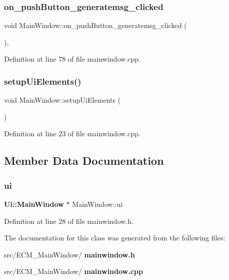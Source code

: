 \subsubsection{on\+\_\+push\+Button\+\_\+generatemsg\+\_\+clicked}
{\footnotesize\ttfamily void Main\+Window\+::on\+\_\+push\+Button\+\_\+generatemsg\+\_\+clicked (\begin{DoxyParamCaption}{ }\end{DoxyParamCaption})\hspace{0.3cm}{\ttfamily [private]}, {\ttfamily [slot]}}



Definition at line 78 of file mainwindow.\+cpp.

\mbox{\label{class_main_window_ac30b6e05110f500244ecd15456a652b0}} 
\subsubsection{setup\+Ui\+Elements()}
{\footnotesize\ttfamily void Main\+Window\+::setup\+Ui\+Elements (\begin{DoxyParamCaption}{ }\end{DoxyParamCaption})}



Definition at line 23 of file mainwindow.\+cpp.



\subsection{Member Data Documentation}
\mbox{\label{class_main_window_a43606649aeaf9e561328935fca0cd1bf}} 
\subsubsection{ui}
{\footnotesize\ttfamily \textbf{ Ui\+::\+Main\+Window} $\ast$ Main\+Window\+::ui\hspace{0.3cm}{\ttfamily [private]}}



Definition at line 28 of file mainwindow.\+h.



The documentation for this class was generated from the following files\+:\begin{DoxyCompactItemize}
\item 
src/\+E\+C\+M\+\_\+\+Main\+Window/\textbf{ mainwindow.\+h}\item 
src/\+E\+C\+M\+\_\+\+Main\+Window/\textbf{ mainwindow.\+cpp}\end{DoxyCompactItemize}
